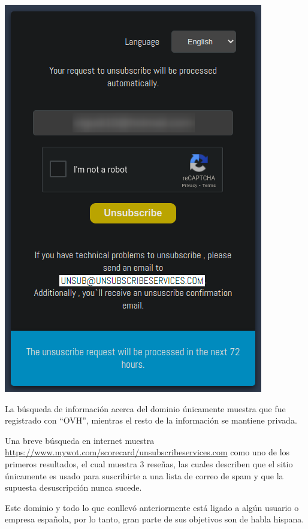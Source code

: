 \documentclass[11pt]{article}
\begin{document}
\begin{center}
\includegraphics[width=.9\linewidth]{./assets/20220531-010337.png}
\end{center}

La búsqueda de información acerca del dominio únicamente muestra que fue registrado con ``OVH'', mientras el resto de la información se mantiene privada.

Una breve búsqueda en internet muestra \url{https://www.mywot.com/scorecard/unsubscribeservices.com} como uno de los primeros resultados, el cual muestra 3 reseñas, las cuales describen que el sitio únicamente es usado para suscribirte a una lista de correo de spam y que la supuesta desuscripción nunca sucede.

Este dominio y todo lo que conllevó anteriormente está ligado a algún usuario o empresa española, por lo tanto, gran parte de sus objetivos son de habla hispana.
\end{document}
